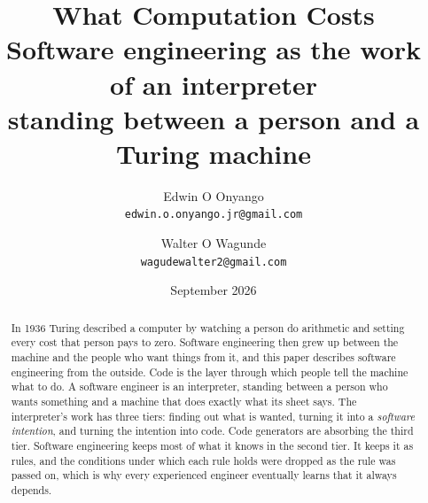 \documentclass[11pt,oneside]{article}
\title{\vspace{-1.2cm}\textbf{\color{accent}What Computation Costs}\\[0.4cm]
\large Software engineering as the work of an interpreter\\
standing between a person and a Turing machine}
\author{
Edwin O Onyango\\[-1pt]
\small\texttt{edwin.o.onyango.jr@gmail.com}
\and
Walter O Wagunde\\[-1pt]
\small\texttt{wagudewalter2@gmail.com}
}
\date{September 2026}
\theoremstyle{definition}
\theoremstyle{remark}
\begin{document}
\maketitle
\thispagestyle{empty}
\vspace{-0.5cm}
\begin{abstract}
\noindent In 1936 Turing described a computer by watching a person do arithmetic and
setting every cost that person pays to zero. Software engineering then grew up between the
machine and the people who want things from it, and this paper describes software
engineering from the outside. Code is the layer through which people tell the machine what
to do. A software engineer is an interpreter, standing between a person who wants something and
a machine that does exactly what its sheet says. The interpreter's work has three tiers:
finding out what is wanted, turning it into a \emph{software intention}, and turning the
intention into code. Code generators are absorbing the third tier. Software engineering keeps most of
what it knows in the second tier. It keeps it as rules, and the conditions under
which each rule holds were dropped as the rule was passed on, which is why every
experienced engineer eventually learns that it always depends.


\end{abstract}
\end{document}
